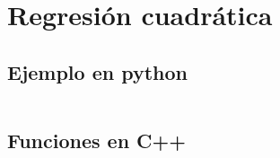 \chapter{Regresión cuadrática}
\label{appendix:regresion_cuadratica}

\section{Ejemplo en python}
\inputminted{python}{apendices/regresion_cuadratica.py}

\section{Funciones en C++}

\inputminted{c++}{apendices/reg2.h}
